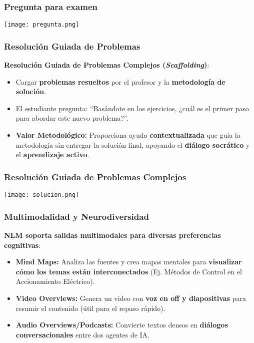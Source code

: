 \documentclass[aspectratio=43]{beamer}
\begin{document}
\begin{frame}
  \frametitle{Pregunta para examen}
  \begin{center}
    \texttt{[image: pregunta.png]}
  \end{center}
\end{frame}

\begin{frame}
\frametitle{ Resolución Guiada de Problemas}

\textbf{Resolución Guiada de Problemas Complejos (\textit{Scaffolding})}:
\begin{itemize}
    \item Cargar \textbf{problemas resueltos} por el profesor y la \textbf{metodología de solución}.
    \item El estudiante pregunta: “Basándote en los ejercicios, ¿cuál es el primer paso para abordar este nuevo problema?”.
    \item \textbf{Valor Metodológico:} Proporciona ayuda \textbf{contextualizada} que guía la metodología sin entregar la solución final, apoyando el \textbf{diálogo socrático} y el \textbf{aprendizaje activo}.
\end{itemize}
\end{frame}

\begin{frame}
  \frametitle{Resolución Guiada de Problemas Complejos}
  \begin{center}
    \texttt{[image: solucion.png]}
  \end{center}
\end{frame}

\begin{frame}
\frametitle{ Multimodalidad y Neurodiversidad}

\textbf{NLM soporta salidas multimodales para diversas preferencias cognitivas}:
\begin{itemize}
    \item \textbf{Mind Maps:} Analiza las fuentes y crea mapas mentales para \textbf{visualizar cómo los temas están interconectados} (Ej. Métodos de Control en el Accionamiento Eléctrico).
    \item \textbf{Video Overviews:} Genera un video con \textbf{voz en off y diapositivas} para resumir el contenido (útil para el repaso rápido).
    \item \textbf{Audio Overviews/Podcasts:} Convierte textos densos en \textbf{diálogos conversacionales} entre dos agentes de IA.
\end{itemize}
\end{frame}
\end{document}
